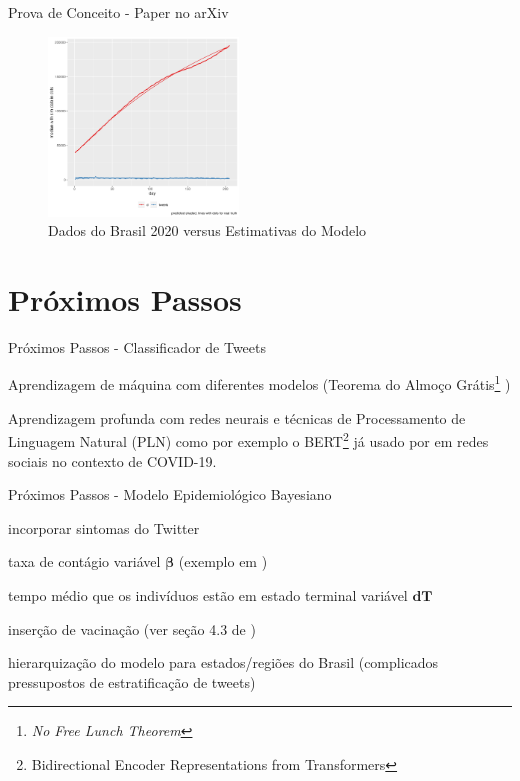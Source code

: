 \documentclass[aspectratio=169]{beamer}                    %
\begin{document}
\begin{frame}{Prova de Conceito - Paper no arXiv \parencite{storopoliSimulationDrivenCOVID19Epidemiological2021a}}
    \begin{figure}
        \centering
        \includegraphics[width=0.45\textwidth]{fit_brazil.png}
        \caption{Dados do Brasil 2020 versus Estimativas do Modelo}
        \label{fig:fit_brazil}
    \end{figure}
\end{frame}

\section{Próximos Passos}
\begin{frame}{Próximos Passos - Classificador de Tweets}
    \begin{vfilleditems}
        \item Aprendizagem de máquina com diferentes modelos (Teorema do Almoço Grátis\footnote{\textit{No Free Lunch Theorem}} \parencite{wolpertLackPrioriDistinctions1996})
        \item Aprendizagem profunda com redes neurais e técnicas de Processamento de Linguagem Natural (PLN)
        como por exemplo o BERT\footnote{Bidirectional Encoder Representations from Transformers} \parencite{devlinBERTPretrainingDeep2018}
        já usado por \textcite{Kaushal_2020,santosh2020detecting} em redes sociais no contexto de COVID-19.
    \end{vfilleditems}
\end{frame}

\begin{frame}{Próximos Passos - Modelo Epidemiológico Bayesiano}
    \begin{vfilleditems}
        \item incorporar sintomas do Twitter
        \item taxa de contágio variável $\boldsymbol{\beta}$ (exemplo em \textcite{jaganFastEstimationTimevarying2020})
        \item tempo médio que os indivíduos estão em estado terminal variável $\boldsymbol{dT}$
        \item inserção de vacinação (ver seção 4.3 de \textcite{gleesonCalibratingCOVID19SEIR2021})
        \item hierarquização do modelo para estados/regiões do Brasil (complicados pressupostos de estratificação de tweets)
    \end{vfilleditems}
\end{frame}
\end{document}
